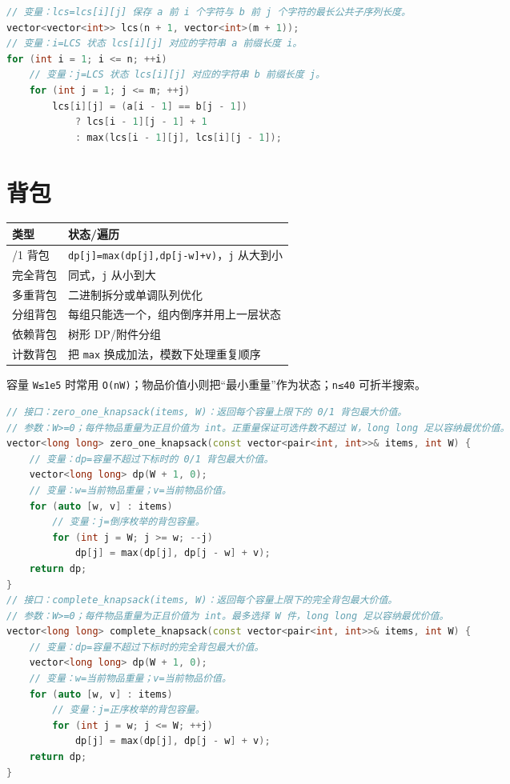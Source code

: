 \begin{lstlisting}[language={C++}]
// 变量：lcs=lcs[i][j] 保存 a 前 i 个字符与 b 前 j 个字符的最长公共子序列长度。
vector<vector<int>> lcs(n + 1, vector<int>(m + 1));
// 变量：i=LCS 状态 lcs[i][j] 对应的字符串 a 前缀长度 i。
for (int i = 1; i <= n; ++i)
    // 变量：j=LCS 状态 lcs[i][j] 对应的字符串 b 前缀长度 j。
    for (int j = 1; j <= m; ++j)
        lcs[i][j] = (a[i - 1] == b[j - 1])
            ? lcs[i - 1][j - 1] + 1
            : max(lcs[i - 1][j], lcs[i][j - 1]);
\end{lstlisting}

\section{背包}\label{ux80ccux5305}

\begin{longtable}[]{@{}ll@{}}
\toprule\noalign{}
类型 & 状态/遍历 \\
\midrule\noalign{}
\endhead
\bottomrule\noalign{}
\endlastfoot
0/1 背包 & \passthrough{\lstinline!dp[j]=max(dp[j],dp[j-w]+v)!}，\passthrough{\lstinline!j!} 从大到小 \\
完全背包 & 同式，\passthrough{\lstinline!j!} 从小到大 \\
多重背包 & 二进制拆分或单调队列优化 \\
分组背包 & 每组只能选一个，组内倒序并用上一层状态 \\
依赖背包 & 树形 DP/附件分组 \\
计数背包 & 把 \passthrough{\lstinline!max!} 换成加法，模数下处理重复顺序 \\
\end{longtable}

容量 \passthrough{\lstinline!W≤1e5!} 时常用 \passthrough{\lstinline!O(nW)!}；物品价值小则把``最小重量''作为状态；\passthrough{\lstinline!n≤40!} 可折半搜索。

\begin{lstlisting}[language={C++}]
// 接口：zero_one_knapsack(items, W)：返回每个容量上限下的 0/1 背包最大价值。
// 参数：W>=0；每件物品重量为正且价值为 int。正重量保证可选件数不超过 W，long long 足以容纳最优价值。
vector<long long> zero_one_knapsack(const vector<pair<int, int>>& items, int W) {
    // 变量：dp=容量不超过下标时的 0/1 背包最大价值。
    vector<long long> dp(W + 1, 0);
    // 变量：w=当前物品重量；v=当前物品价值。
    for (auto [w, v] : items)
        // 变量：j=倒序枚举的背包容量。
        for (int j = W; j >= w; --j)
            dp[j] = max(dp[j], dp[j - w] + v);
    return dp;
}
// 接口：complete_knapsack(items, W)：返回每个容量上限下的完全背包最大价值。
// 参数：W>=0；每件物品重量为正且价值为 int。最多选择 W 件，long long 足以容纳最优价值。
vector<long long> complete_knapsack(const vector<pair<int, int>>& items, int W) {
    // 变量：dp=容量不超过下标时的完全背包最大价值。
    vector<long long> dp(W + 1, 0);
    // 变量：w=当前物品重量；v=当前物品价值。
    for (auto [w, v] : items)
        // 变量：j=正序枚举的背包容量。
        for (int j = w; j <= W; ++j)
            dp[j] = max(dp[j], dp[j - w] + v);
    return dp;
}
\end{lstlisting}

